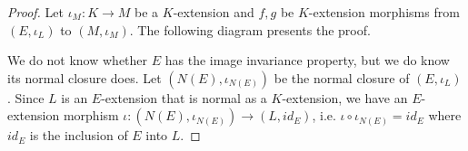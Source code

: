 \documentclass[../book.tex]{subfiles}
\begin{document}
\begin{proof}
        Let $\iota_M : K \to M$ be a $K$-extension and 
        $f, g$ be $K$-extension morphisms from $(E,\iota_L)$ to $(M,\iota_M)$.
        The following diagram presents the proof. 
        \begin{figure} [H]
            \centering
        \end{figure}
        We do not know whether $E$ has the image invariance property,
        but we do know its normal closure does. 
        Let $(N(E),\iota_{N(E)})$ be the normal closure of $(E,\iota_L)$. 
        Since $L$ is an $E$-extension that is normal as a $K$-extension,
        we have an $E$-extension morphism 
        $\iota : (N(E),\iota_{N(E)}) \to (L,id_E)$,
        i.e. $\iota\circ\iota_{N(E)} = id_E$ 
        where $id_E$ is the inclusion of $E$ into $L$.  
        

\end{proof}
\end{document}
